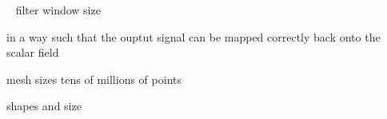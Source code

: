 
~\cite[p.~106-112]{Jaehne97} filter window size

 in a way such that the ouptut signal can be mapped correctly back onto the scalar field~\cite[p.~106-112]{Jaehne97}

 mesh sizes tens of millions of points ~\cite[25,144]{Mara17}~\cite[4]{ILATO14}
 
 shapes and size ~\cite[p.~29]{Mara12}
 
 
